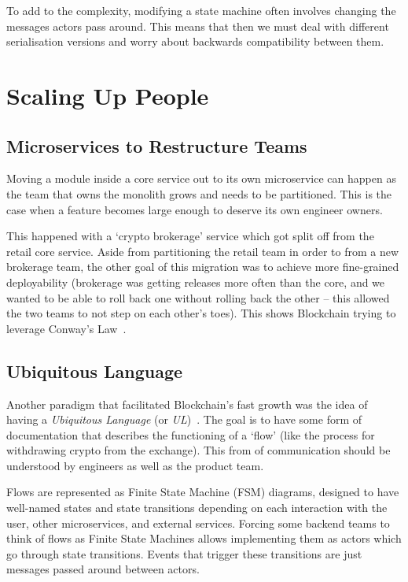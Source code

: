 \documentclass[conference]{IEEEtran}
\begin{document}
    To add to the complexity, modifying a state machine often involves changing the messages actors
    pass around.
    This means that then we must deal with different serialisation versions and worry about
    backwards compatibility between them.


    \section{Scaling Up People}

    \subsection{Microservices to Restructure Teams}

    Moving a module inside a core service out to its own microservice can happen as the team that
    owns the monolith grows and needs to be partitioned.
    This is the case when a feature becomes large enough to deserve its own engineer owners.

    This happened with a `crypto brokerage' service which got split off from the retail core
    service.
    Aside from partitioning the retail team in order to from a new brokerage team, the other goal of
    this migration was to achieve more fine-grained deployability (brokerage was getting releases
    more often than the core, and we wanted to be able to roll back one without rolling back the
    other -- this allowed the two teams to not step on each other's toes).
    This shows Blockchain trying to leverage Conway's Law~\cite{conwayLaw}.\\

    \subsection{Ubiquitous Language}\label{subsec:ul}

    Another paradigm that facilitated Blockchain's fast growth was the idea of having a
    \emph{Ubiquitous Language} (or \emph{UL})~\cite{evansDomainDrivenDesignUL, fowlerUL}.
    The goal is to have some form of documentation that describes the functioning of a `flow' (like
    the process for withdrawing crypto from the exchange).
    This from of communication should be understood by engineers as well as the product team.

    Flows are represented as Finite State Machine (FSM) diagrams, designed to have well-named states and
    state transitions depending on each interaction with the user, other microservices, and external
    services.
    Forcing some backend teams to think of flows as Finite State Machines allows implementing
    them as actors which go through state transitions.
    Events that trigger these transitions are just messages passed around between actors.
\end{document}
